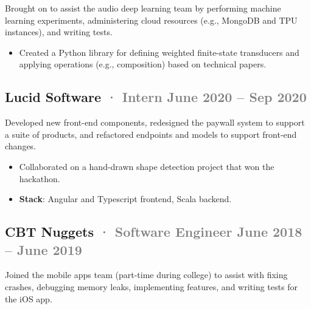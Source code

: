 \documentclass[12pt]{article} %
\providecommand{\tightlist}{%
  \setlength{\itemsep}{0pt}\setlength{\parskip}{0pt}}
\renewcommand{\emph}[1]{%
  \textcolor{gray}{#1}%
}
\begin{document}
Brought on to assist the audio deep learning team by performing machine
learning experiments, administering cloud resources (e.g., MongoDB and
TPU instances), and writing tests.

\begin{itemize}
\tightlist
\item
  Created a Python library for defining weighted finite-state
  transducers and applying operations (e.g., composition) based on
  technical papers.
\end{itemize}

\hypertarget{lucid-software-intern-june-2020-sep-2020}{%
\subsection{\texorpdfstring{Lucid Software \emph{· \small Intern
\hfill June 2020 -- Sep
2020}}{Lucid Software · Intern June 2020 -- Sep 2020}}\label{lucid-software-intern-june-2020-sep-2020}}

Developed new front-end components, redesigned the paywall system to
support a suite of products, and refactored endpoints and models to
support front-end changes.

\begin{itemize}
\tightlist
\item
  Collaborated on a hand-drawn shape detection project that won the
  hackathon.
\item
  \textbf{Stack}: Angular and Typescript frontend, Scala backend.
\end{itemize}

\hypertarget{cbt-nuggets-software-engineer-june-2018-june-2019}{%
\subsection{\texorpdfstring{CBT Nuggets \emph{· \small Software Engineer
\hfill June 2018 -- June
2019}}{CBT Nuggets · Software Engineer June 2018 -- June 2019}}\label{cbt-nuggets-software-engineer-june-2018-june-2019}}

Joined the mobile apps team (part-time during college) to assist with
fixing crashes, debugging memory leaks, implementing features, and
writing tests for the iOS app.
\end{document}
